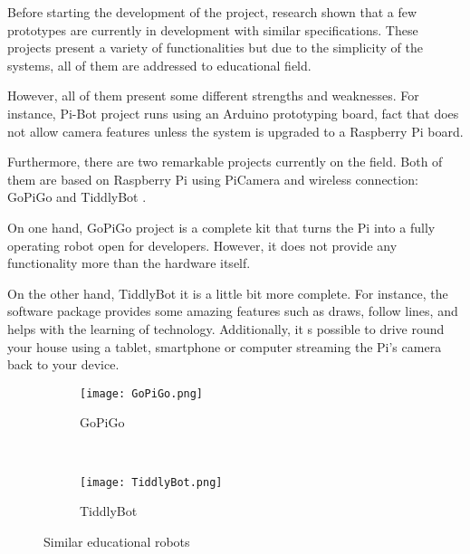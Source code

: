 Before starting the development of the project, research shown that a few prototypes are currently in development with similar specifications. These projects present a variety of functionalities but due to the simplicity of the systems, all of them are addressed to educational field.

However, all of them present some different strengths and weaknesses. For instance, Pi-Bot \cite{PiBot} project runs using an Arduino prototyping board, fact that does not allow camera features unless the system is upgraded to a Raspberry Pi board. 

Furthermore, there are two remarkable projects currently on the field. Both of them are based on Raspberry Pi using PiCamera and wireless connection: GoPiGo \cite{GoPiGo} and TiddlyBot \cite{TiddlyBot}. 

On one hand, GoPiGo project is a complete kit that turns the Pi into a fully operating robot open for developers. However, it does not provide any functionality more than the hardware itself.

On the other hand, TiddlyBot it is a little bit more complete. For instance, the software package provides some amazing features such as draws, follow lines, and helps with the learning of technology. Additionally, it s possible to drive round your house using a tablet, smartphone or computer streaming the Pi's camera back to your device.

\begin{figure}
     \centering
     \begin{subfigure}[b]{0.3\textwidth}
             \texttt{[image: GoPiGo.png]}
             \caption{GoPiGo}
             \label{fig:GoPiGo}
     \end{subfigure}%
     ~
     \begin{subfigure}[b]{0.3\textwidth}
             \texttt{[image: TiddlyBot.png]}
             \caption{TiddlyBot}
             \label{fig:TiddlyBot}
     \end{subfigure}
     \caption{Similar educational robots}\label{fig:robots}
\end{figure}